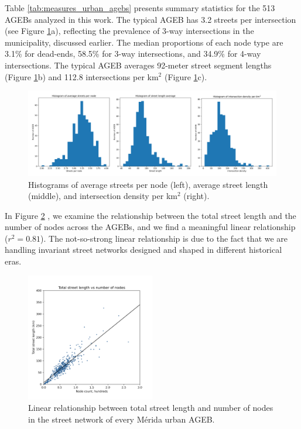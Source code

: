 Table \ref{tab:measures_urban_agebs} presents summary statistics for the 513 AGEBs analyzed in this work. The typical AGEB has 3.2 streets per intersection (see Figure \ref{fig:merida-ageb-histograms}a), reflecting the prevalence of 3-way intersections in the municipality, discussed earlier. The median proportions of each node type are 3.1\% for dead-ends, 58.5\% for 3-way intersections, and 34.9\% for 4-way intersections. The typical AGEB averages 92-meter street segment lengths (Figure \ref{fig:merida-ageb-histograms}b) and 112.8 intersections per km$^2$ (Figure \ref{fig:merida-ageb-histograms}c).

\begin{figure}[htpb]
  \centering
  \includegraphics[width=\textwidth]{Figures/merida-ageb-histograms.png}
  \caption{Histograms of average streets per node (left), average street length (middle), and intersection density per km$^2$ (right).
    \label{fig:merida-ageb-histograms}}
\end{figure}

In Figure \ref{fig:merida-ageb-street-length-vs-nodes} , we examine the relationship between the total street length and the number of nodes across the AGEBs, and we find a meaningful linear relationship ($r^2 = 0.81$). The not-so-strong linear relationship is due to the fact that we are handling invariant street networks designed and shaped in different historical eras.

\begin{figure}[htpb]
  \centering
  \includegraphics[width=0.5\textwidth]{Figures/merida-ageb-street-length-vs-nodes.png}
  \caption{Linear relationship between total street length and number of nodes in the street network of every Mérida urban AGEB.
    \label{fig:merida-ageb-street-length-vs-nodes}}
\end{figure}

